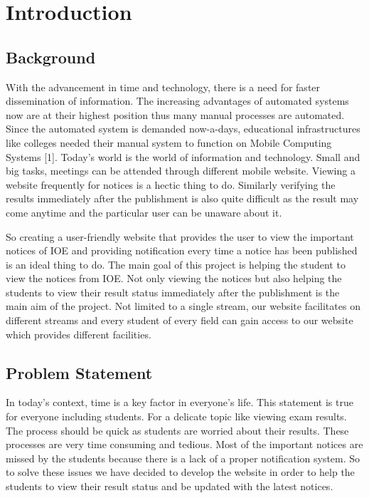 

\newpage
{} %

\chapter{Introduction}
\section{Background}\label{sec:bkgrnd}%
 With the advancement in time and technology, there is a need for faster dissemination 
of information. The increasing advantages of automated systems now are at their 
highest position thus many manual processes are automated. Since the automated 
system is demanded now-a-days, educational infrastructures like colleges needed their 
manual system to function on Mobile Computing Systems [1]. Today's world is the 
world of information and technology. Small and big tasks, meetings can be attended 
through different mobile website. Viewing a website frequently for notices is a hectic 
thing to do. Similarly verifying the results immediately after the publishment is also 
quite difficult as the result may come anytime and the particular user can be unaware 
about it.


So creating a user-friendly website that provides the user to view the important notices 
of IOE and providing notification every time a notice has been published is an ideal 
thing to do. The main goal of this project is helping the student to view the notices from 
IOE. Not only viewing the notices but also helping the students to view their result 
status immediately after the publishment is the main aim of the project. Not limited to 
a single stream, our website facilitates on different streams and every student of every 
field can gain access to our website which provides different facilities.


  
\section{Problem Statement}
In today's context, time is a key factor in everyone’s life. This statement is true for 
everyone including students. For a delicate topic like viewing exam results. The process 
should be quick as students are worried about their results. These processes are very 
time consuming and tedious. Most of the important notices are missed by the students 
because there is a lack of a proper notification system. So to solve these issues we have 
decided to develop the website in order to help the students to view their result status 
and be updated with the latest notices.

